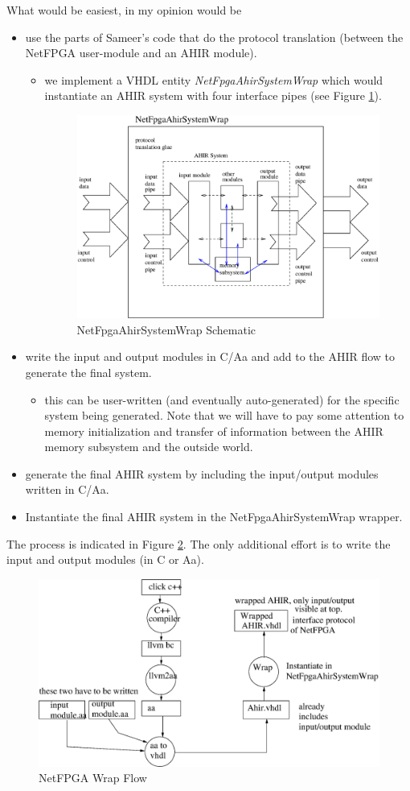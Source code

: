 \documentclass{article}
\begin{document}
What would be easiest, in my opinion would be
\begin{itemize}
\item use the parts of Sameer's code that do the protocol
translation (between the NetFPGA user-module and an AHIR module).
\begin{itemize}
\item we implement a VHDL entity {\em NetFpgaAhirSystemWrap} which 
would instantiate an AHIR system with four interface pipes (see Figure \ref{fig:NetFpgaAhirSystemWrap}).
\begin{figure}
  \centering
  \includegraphics[scale=0.7]{NetFpgaAhirSystemWrap.eps}
  \caption{NetFpgaAhirSystemWrap Schematic}
  \label{fig:NetFpgaAhirSystemWrap}
\end{figure}
\end{itemize}
\item write the input and output modules in C/Aa and add
to the AHIR flow to generate the final system. 
\begin{itemize}
\item this can be user-written (and eventually auto-generated) for
the specific system being generated.  Note that we will have
to pay some attention to memory initialization and transfer of
information between the AHIR memory subsystem and the outside
world.
\end{itemize}
\item generate the final AHIR system by including the input/output modules
written in C/Aa.
\item Instantiate the final AHIR system in the NetFpgaAhirSystemWrap wrapper.
\end{itemize}
The process is indicated in Figure \ref{fig:Wrap}.   The only
additional effort is to write the input and output modules (in C or Aa).


\begin{figure}
  \centering
  \includegraphics[scale=0.7]{NetFPGAWrap.eps}
  \caption{NetFPGA Wrap Flow}
  \label{fig:Wrap}
\end{figure}
\end{document}
